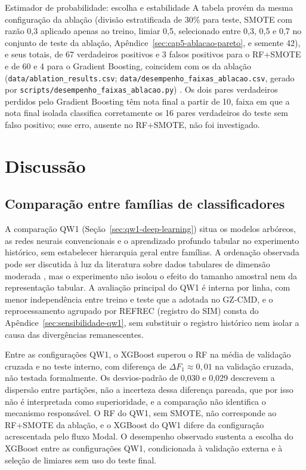 \begin{chapter}{Estimador de probabilidade: escolha e estabilidade}
A tabela provém da mesma configuração da ablação (divisão estratificada de 30\% para teste, SMOTE com razão 0,3 aplicado apenas ao treino, limiar 0,5, selecionado entre 0,3, 0,5 e 0,7 no conjunto de teste da ablação, Apêndice~\ref{sec:cap5-ablacao-pareto}, e semente 42), e seus totais, de 67 verdadeiros positivos e 3 falsos positivos para o RF+SMOTE e de 60 e 4 para o Gradient Boosting, coincidem com os da ablação (\texttt{data/ablation\_results.csv}; \texttt{data/\allowbreak desempenho\_\allowbreak faixas\_\allowbreak ablacao.csv}, gerado por \texttt{scripts/\allowbreak desempenho\_\allowbreak faixas\_\allowbreak ablacao.py}) \cite{Jardim2026phdrepo}. Os dois pares verdadeiros perdidos pelo Gradient Boosting têm nota final a partir de 10, faixa em que a nota final isolada classifica corretamente os 16 pares verdadeiros do teste sem falso positivo; esse erro, ausente no RF+SMOTE, não foi investigado.

\section{Discussão}\label{sec:e2-discussao}

\subsection{Comparação entre famílias de classificadores}\label{sec:e2-discussao-familias}

A comparação QW1 (Seção~\ref{sec:qw1-deep-learning}) situa os modelos arbóreos, as redes neurais convencionais e o aprendizado profundo tabular no experimento histórico, sem estabelecer hierarquia geral entre famílias. A ordenação observada pode ser discutida à luz da literatura sobre dados tabulares de dimensão moderada \cite{Grinsztajn2022tabular, ShwartzZiv2022tabular}, mas o experimento não isolou o efeito do tamanho amostral nem da representação tabular. A avaliação principal do QW1 é interna por linha, com menor independência entre treino e teste que a adotada no GZ-CMD, e o reprocessamento agrupado por REFREC (registro do SIM) consta do Apêndice~\ref{sec:sensibilidade-qw1}, sem substituir o registro histórico nem isolar a causa das divergências remanescentes.

Entre as configurações QW1, o XGBoost superou o RF na média de validação cruzada e no teste interno, com diferença de $\Delta F_1 \approx 0{,}01$ na validação cruzada, não testada formalmente. Os desvios-padrão de 0,030 e 0,029 descrevem a dispersão entre partições, não a incerteza dessa diferença pareada, que por isso não é interpretada como superioridade, e a comparação não identifica o mecanismo responsável. O RF do QW1, sem SMOTE, não corresponde ao RF+SMOTE da ablação, e o XGBoost do QW1 difere da configuração acrescentada pelo fluxo Modal. O desempenho observado sustenta a escolha do XGBoost entre as configurações QW1, condicionada à validação externa e à seleção de limiares sem uso do teste final.


\end{chapter}
